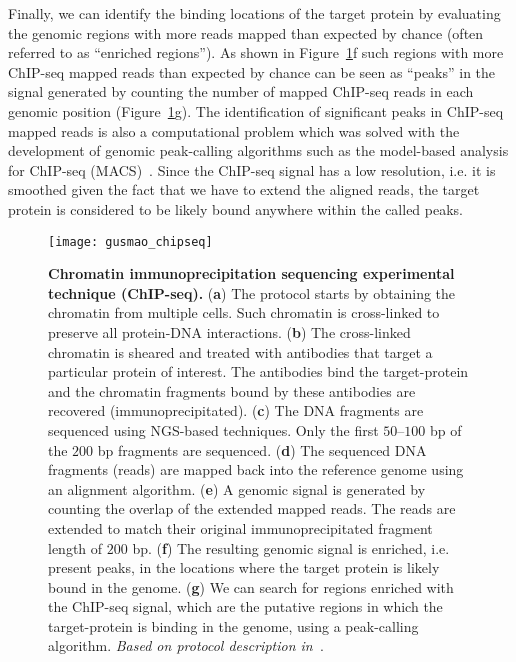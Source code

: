 Finally, we can identify the binding locations of the target protein by evaluating the genomic regions with more reads mapped than expected by chance (often referred to as ``enriched regions''). As shown in Figure~\ref{fig:gusmao_chipseq}f such regions with more ChIP-seq mapped reads than expected by chance can be seen as ``peaks'' in the signal generated by counting the number of mapped ChIP-seq reads in each genomic position (Figure~\ref{fig:gusmao_chipseq}g). The identification of significant peaks in ChIP-seq mapped reads is also a computational problem which was solved with the development of  genomic peak-calling algorithms such as the model-based analysis for ChIP-seq (MACS)~\citep{zhang2008}. Since the ChIP-seq signal has a low resolution, i.e. it is smoothed given the fact that we have to extend the aligned reads, the target protein is considered to be likely bound anywhere within the called peaks.

\begin{figure}[h!]
\centering
\texttt{[image: gusmao\_chipseq]}
\caption[Chromatin immunoprecipitation sequencing experimental technique (ChIP-seq)]{\textbf{Chromatin immunoprecipitation sequencing experimental technique (ChIP-seq).} (\textbf{a}) The protocol starts by obtaining the chromatin from multiple cells. Such chromatin is cross-linked to preserve all protein-DNA interactions. (\textbf{b}) The cross-linked chromatin is sheared and treated with antibodies that target a particular protein of interest. The antibodies bind the target-protein and the chromatin fragments bound by these antibodies are recovered (immunoprecipitated). (\textbf{c}) The DNA fragments are sequenced using NGS-based techniques. Only the first $50$--$100$ bp of the \approxy$200$ bp fragments are sequenced. (\textbf{d}) The sequenced DNA fragments (reads) are mapped back into the reference genome using an alignment algorithm. (\textbf{e}) A genomic signal is generated by counting the overlap of the extended mapped reads. The reads are extended to match their original immunoprecipitated fragment length of \approxy$200$ bp. (\textbf{f}) The resulting genomic signal is enriched, i.e. present peaks, in the locations where the target protein is likely bound in the genome. (\textbf{g}) We can search for regions enriched with the ChIP-seq signal, which are the putative regions in which the target-protein is binding in the genome, using a peak-calling algorithm. \emph{Based on protocol description in~\cite{johnson2007}}.}
\label{fig:gusmao_chipseq}
\end{figure}

